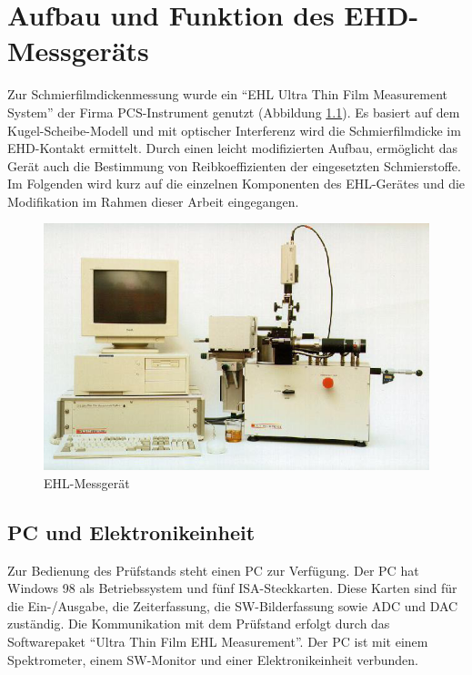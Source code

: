 \chapter{Aufbau und Funktion des EHD-Messgeräts}
\label{chap:aufbau_und_funktion_des_ehd_messgeraets}

Zur Schmierfilmdickenmessung wurde ein ``EHL Ultra Thin Film Measurement System'' der Firma PCS-Instrument genutzt (Abbildung \ref{fig:ehl_messgeraet}).
Es basiert auf dem Kugel-Scheibe-Modell und mit optischer Interferenz wird die Schmierfilmdicke im EHD-Kontakt ermittelt.
Durch einen leicht modifizierten Aufbau, ermöglicht das Gerät auch die Bestimmung von Reibkoeffizienten der eingesetzten Schmierstoffe.
Im Folgenden wird kurz auf die einzelnen Komponenten des EHL-Gerätes und die Modifikation im Rahmen dieser Arbeit eingegangen.

\begin{figure}[htb]
    \centering
    \includegraphics[width=0.8\linewidth]{./images/ehl_pruefstand.png}
    \caption{EHL-Messgerät \cite{ehl}}
    \label{fig:ehl_messgeraet}
\end{figure}

\section{PC und Elektronikeinheit}
\label{sec:pc_elektronikeinheit}

Zur Bedienung des Prüfstands steht einen PC zur Verfügung.
Der PC hat Windows 98 als Betriebssystem und fünf ISA-Steckkarten.
Diese Karten sind für die Ein-/Ausgabe, die Zeiterfassung, die SW-Bilderfassung sowie ADC und DAC zuständig.
Die Kommunikation mit dem Prüfstand erfolgt durch das Softwarepaket ``Ultra Thin Film EHL Measurement''.
Der PC ist mit einem Spektrometer, einem SW-Monitor und einer Elektronikeinheit verbunden.

